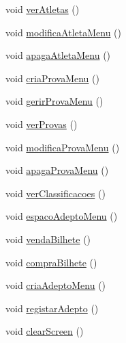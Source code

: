 \begin{DoxyCompactItemize}
void \hyperlink{class_menu_a10eed8f175ddff4a3f6b01010e7b462b}{ver\+Atletas} ()
\item 
void \hyperlink{class_menu_a1803b57b4861a1a9c512a15657eba2f2}{modifica\+Atleta\+Menu} ()
\item 
void \hyperlink{class_menu_a1297455c0dcde9efe57a977620a95091}{apaga\+Atleta\+Menu} ()
\item 
void \hyperlink{class_menu_a22f88ce6c2e5c2e99e3b5bb510f75725}{cria\+Prova\+Menu} ()
\item 
void \hyperlink{class_menu_ad27d59e38495e239dcad48d5bfba7aa5}{gerir\+Prova\+Menu} ()
\item 
void \hyperlink{class_menu_a8b215f578a6ec8be58b2d8cbe464dfcf}{ver\+Provas} ()
\item 
void \hyperlink{class_menu_a58d5cd0655078b665745f75af8bb43c4}{modifica\+Prova\+Menu} ()
\item 
void \hyperlink{class_menu_a4148128d956d192efbd3eb489ac170bb}{apaga\+Prova\+Menu} ()
\item 
void \hyperlink{class_menu_a6062588d8f20a4ab2304dc9c9fdaaa52}{ver\+Classificacoes} ()
\item 
void \hyperlink{class_menu_a98a46fa2c5c35c6875571bf2864b0e5e}{espaco\+Adepto\+Menu} ()
\item 
void \hyperlink{class_menu_a006d90f89c70667c1b78921d1699df87}{venda\+Bilhete} ()
\item 
void \hyperlink{class_menu_a1267ff1e1b75f1e1003522d1d99a8c7e}{compra\+Bilhete} ()
\item 
void \hyperlink{class_menu_a0bbe99d5051c3e1102d8e2521dacbc02}{cria\+Adepto\+Menu} ()
\item 
void \hyperlink{class_menu_a04fe7a1b1ef14f3629f0d837d1d7b287}{registar\+Adepto} ()
\item 
void \hyperlink{class_menu_ae3a5edcb580112ec449d12d9eb5a3e7c}{clear\+Screen} ()
\end{DoxyCompactItemize}
